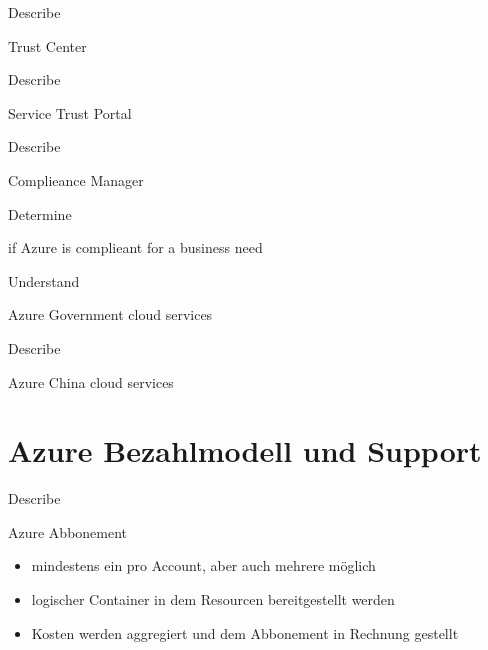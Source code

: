 \documentclass{scrartcl}
\newenvironment{flashcard}[2][]{%
    #1
    \vfill
    \centerline{\Large{#2}}
    \vfill
\newpage
}
{\newpage}
\newcommand{\sectioncard}[1]{
    \vspace*{\stretch{1}}
    \section{#1}
    \vspace*{\stretch{1}}
    \pagebreak
}
\begin{document}
    \begin{flashcard}[Describe]{Trust Center}

    \end{flashcard}

    \begin{flashcard}[Describe]{Service Trust Portal}

    \end{flashcard}

    \begin{flashcard}[Describe]{Complieance Manager}

    \end{flashcard}

    \begin{flashcard}[Determine]{if Azure is complieant for a business need}

    \end{flashcard}

    \begin{flashcard}[Understand]{Azure Government cloud services}

    \end{flashcard}

    \begin{flashcard}[Describe]{Azure China cloud services}

    \end{flashcard}

    \sectioncard{Azure Bezahlmodell und Support}

    \begin{flashcard}[Describe]{Azure Abbonement}
        \begin{itemize}
            \item mindestens ein pro Account, aber auch mehrere möglich
            \item logischer Container in dem Resourcen bereitgestellt werden
            \item Kosten werden aggregiert und dem Abbonement in Rechnung gestellt
        \end{itemize}
    \end{flashcard}
\end{document}
